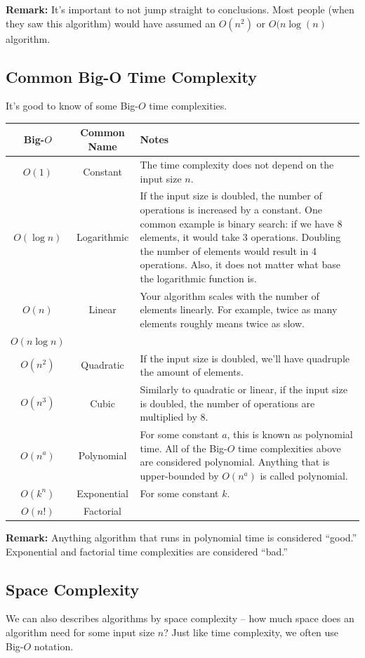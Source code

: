 \documentclass[letterpaper]{article}
\begin{document}
\textbf{Remark:} It's important to not jump straight to conclusions. Most people (when they saw this algorithm) would have assumed an $O(n^2)$ or $O(n\log(n)$ algorithm.

\newpage 
\subsection{Common Big-O Time Complexity}
It's good to know of some Big-$O$ time complexities.
\begin{center}
    \begin{tabular}{c|c|p{7cm}}
        Big-$O$ & Common Name & Notes \\ 
        \hline 
        $O(1)$ & Constant & The time complexity does not depend on the input size $n$. \\ 
        $O(\log n)$ & Logarithmic & If the input size is doubled, the number of operations is increased by a constant. One common example is binary search: if we have 8 elements, it would take 3 operations. Doubling the number of elements would result in 4 operations. Also, it does not matter what base the logarithmic function is. \\ 
        $O(n)$ & Linear & Your algorithm scales with the number of elements linearly. For example, twice as many elements roughly means twice as slow. \\ 
        $O(n \log n)$ & & \\ 
        $O(n^2)$ & Quadratic & If the input size is doubled, we'll have quadruple the amount of elements. \\ 
        $O(n^3)$ & Cubic & Similarly to quadratic or linear, if the input size is doubled, the number of operations are multiplied by 8. \\ 
        $O(n^a)$ & Polynomial & For some constant $a$, this is known as polynomial time. All of the Big-$O$ time complexities above are considered polynomial. Anything that is upper-bounded by $O(n^a)$ is called polynomial. \\ 
        $O(k^n)$ & Exponential & For some constant $k$. \\ 
        $O(n!)$ & Factorial &  
    \end{tabular}
\end{center}

\textbf{Remark:} Anything algorithm that runs in polynomial time is considered ``good.'' Exponential and factorial time complexities are considered ``bad.''

\subsection{Space Complexity}
We can also describes algorithms by space complexity -- how much space does an algorithm need for some input size $n$? Just like time complexity, we often use Big-$O$ notation.
\end{document}
